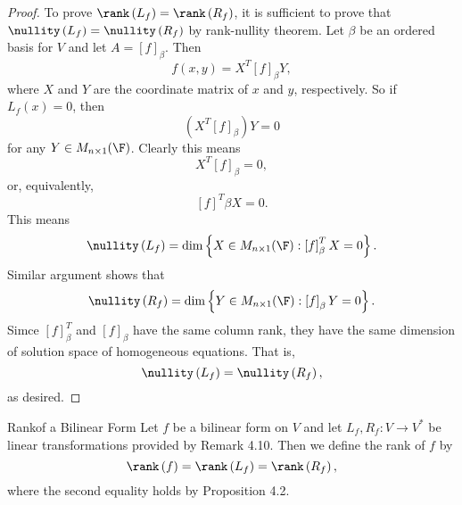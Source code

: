 \documentclass[math_245.tex]{subfiles}
\begin{document}
    \begin{proof}
        To prove $\rank\left( L_f \right) = \rank\left( R_f \right)$, it is sufficient to prove that $\nullity\left( L_f \right) = \nullity\left( R_f \right)$ by rank-nullity theorem. Let $\beta$ be an ordered basis for $V$ and let $A=\left[ f \right] _\beta$. Then
        \begin{equation*}
            f\left( x,y \right) = X^T\left[ f \right] _\beta Y,
        \end{equation*}
        where $X$ and $Y$ are the coordinate matrix of $x$ and $y$, respectively. So if $L_f(x)=0$, then
        \begin{equation*}
            \left( X^T\left[ f \right] _\beta \right) Y = 0
        \end{equation*}
        for any $Y\in M_{n\times 1}(\F)$. Clearly this means
        \begin{equation*}
            X^T\left[ f \right] _\beta = 0,
        \end{equation*}
        or, equivalently,
        \begin{equation*}
            \left[ f \right] ^T\beta X = 0.
        \end{equation*}
        This means
        \begin{equation*}
            \nullity\left( L_f \right) = \dim \left\lbrace X\in M_{n\times 1}(\F): \left[ f \right] ^T_\beta X = 0  \right\rbrace  .
        \end{equation*}
        Similar argument shows that
        \begin{equation*}
            \nullity\left( R_f \right) = \dim\left\lbrace Y\in M_{n\times 1}(\F): \left[ f \right] _\beta Y = 0  \right\rbrace .
        \end{equation*}
        Simce $\left[ f \right] ^T_\beta$ and $\left[ f \right] _\beta$ have the same column rank, they have the same dimension of solution space of homogeneous equations. That is,
        \begin{equation*}
            \nullity\left( L_f \right) = \nullity\left( R_f \right),
        \end{equation*}
        as desired.
    \end{proof}

    \begin{definition}{Rank}{of a Bilinear Form}
        Let $f$ be a bilinear form on $V$ and let $L_f, R_f: V\to V^*$ be linear transformations provided by Remark 4.10. Then we define the rank of $f$ by
        \begin{equation*}
            \rank\left( f \right) = \rank\left( L_f \right) = \rank\left( R_f \right),
        \end{equation*}
        where the second equality holds by Proposition 4.2.
    \end{definition}
\end{document}
